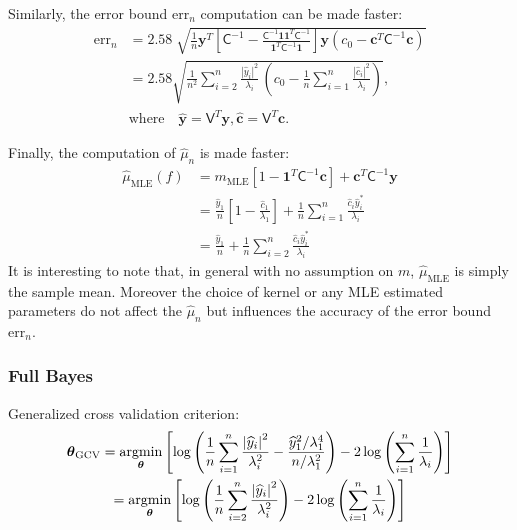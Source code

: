 \documentclass[twocolumn]{svjour3}          %
\newcommand{\bm}[1]{\boldsymbol{#1}}
\newcommand{\trace}[1]{\textup{trace}{#1}}
\newcommand{\vtheta}{{\bm{\theta}}}
\newcommand{\vc}{\bm{c}}
\newcommand{\vy}{\bm{y}}
\newcommand{\vone}{\bm{1}}
\newcommand{\mC}{\mathsf{C}}
\newcommand{\mCInv}{{\mathsf{C}^{-1}}}
\newcommand{\mV}{\mathsf{V}}
\newcommand{\hmu}{\widehat{\mu}}
\newcommand{\MLE}{\text{MLE}}
\newcommand{\errn}{\text{err}_{n}}
\def\abs#1{\ensuremath{\left \lvert #1 \right \rvert}}
\providecommand{\argmin}{\operatorname*{argmin}}
\begin{document}
Similarly, the error bound {$\errn$} computation can be made faster:
\begin{align*}
\errn &=
2.58 \; \sqrt{ 
\frac{1}{n}
\vy^T 
\left[ 
\mCInv - 
\frac{ \mCInv \vone \vone^T \mCInv }{\vone^T\mCInv \vone}
\right] \vy
(c_0 - \vc^T\mC^{-1}\vc) } 
\\
&
=
{{
\displaystyle
{
2.58\sqrt{
\frac {1}{n^2} \sum_{i=2}^{n} \frac{\abs{\widehat{y}_i}^2}{\lambda_i}  
\,
\left( c_0 - \frac 1n \sum_{i=1}^n \frac{\abs{\widehat{c}_i}^2}{\lambda_i} \right) 
}
}
}}, 
\\
\nonumber
& \text{where} \quad 
\widehat{\vy} = \mV^T \vy,  
\widehat{\vc} = \mV^T \vc. 
\end{align*}




Finally, the computation of $\hmu_n$ is made faster:
\begin{align}
\nonumber
\hmu_\MLE(f) &= m_\MLE[1 - \vone^T  \mC^{-1}\vc ]
+
\vc^T \mC^{-1} \vy
\\
\nonumber
&= \frac{\widehat{y}_1}{n} \left[1 - \frac{\widehat{c}_1}{\lambda_1}\right]
+ \frac 1n \sum_{i=1}^n \frac{ \widehat{c}_i \widehat{y}_i^*}{\lambda_i}
\\
\label{eqn:hmu_complicated}
& =
 \frac{\widehat{y}_1}{n} +
 \frac 1n \sum_{i=2}^n \frac{ \widehat{c}_i \widehat{y}_i^*}{\lambda_i}
\end{align}
It is interesting to note that, in general with no assumption on $m$, $\hmu_\MLE$ is simply the sample mean. 
Moreover the choice of kernel or any MLE estimated parameters do not affect the $\hmu_n$ but influences the accuracy of the error bound $\errn$.

\subsubsection{Full Bayes}

Generalized cross validation criterion:
\begin{gather}
\nonumber
\vtheta_{\textup{GCV}} 
= \argmin_\vtheta \left[ \log \left ( \frac 1n \sum_{i=1}^n \frac{\abs{\widehat{y}_i}^2}{\lambda_i^2} - 
\frac{\widehat{y}_1^2/\lambda_1^4}{n/\lambda^2_1}
\right) -2\log\left( \sum_{i=1}^n \frac{1}{\lambda_i} \right)
\right]
\\
= \argmin_\vtheta \left[ \log \left ( \frac 1n \sum_{i=2}^n \frac{\abs{\widehat{y}_i}^2}{\lambda_i^2} 
\right) -2\log\left( \sum_{i=1}^n \frac{1}{\lambda_i} \right)
\right]
\end{gather}
\end{document}
